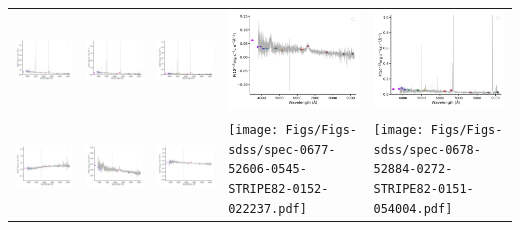 \begin{center}
\begin{longtable}{l l l l l }
    \includegraphics[width=0.19\linewidth, clip]{Figs/Figs-sdss/spec-0520-52288-0312-SPLUS-n02n28-039381.pdf} & \includegraphics[width=0.19\linewidth, clip]{Figs/Figs-sdss/spec-0530-52026-0013-SPLUS-n02n44-027436.pdf} & \includegraphics[width=0.19\linewidth, clip]{Figs/Figs-sdss/spec-0572-52289-0114-SPLUS-n04n01-004018.pdf} & \includegraphics[width=0.19\linewidth, clip]{Figs/Figs-sdss/spec-0573-52325-0471-SPLUS-n04n01-030147.pdf} & \includegraphics[width=0.19\linewidth, clip]{Figs/Figs-sdss/spec-0584-52049-0618-SPLUS-n05n50-017121.pdf} \\
    \includegraphics[width=0.19\linewidth, clip]{Figs/Figs-sdss/spec-0669-52559-0359-STRIPE82-0004-022337.pdf} & \includegraphics[width=0.19\linewidth, clip]{Figs/Figs-sdss/spec-0673-52162-0547-STRIPE82-0140-024629.pdf} & \includegraphics[width=0.19\linewidth, clip]{Figs/Figs-sdss/spec-0674-52201-0135-SPLUS-s02s12-025538.pdf} & \texttt{[image: Figs/Figs-sdss/spec-0677-52606-0545-STRIPE82-0152-022237.pdf]} & \texttt{[image: Figs/Figs-sdss/spec-0678-52884-0272-STRIPE82-0151-054004.pdf]} \\

\end{longtable}
\end{center}
